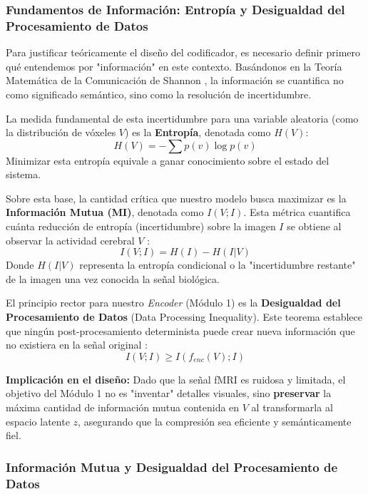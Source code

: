 \documentclass{article}
\begin{document}
\subsubsection{Fundamentos de Información: Entropía y Desigualdad del Procesamiento de Datos}

Para justificar teóricamente el diseño del codificador, es necesario definir primero qué entendemos por "información" en este contexto. Basándonos en la Teoría Matemática de la Comunicación de Shannon \cite{11}, la información se cuantifica no como significado semántico, sino como la resolución de incertidumbre.

La medida fundamental de esta incertidumbre para una variable aleatoria (como la distribución de vóxeles $V$) es la \textbf{Entropía}, denotada como $H(V)$:
\begin{equation}
    H(V) = - \sum p(v) \log p(v)
\end{equation}
Minimizar esta entropía equivale a ganar conocimiento sobre el estado del sistema.

Sobre esta base, la cantidad crítica que nuestro modelo busca maximizar es la \textbf{Información Mutua (MI)}, denotada como $I(V; I)$. Esta métrica cuantifica cuánta reducción de entropía (incertidumbre) sobre la imagen $I$ se obtiene al observar la actividad cerebral $V$ \cite{12}:
\begin{equation}
    I(V; I) = H(I) - H(I|V)
\end{equation}
Donde $H(I|V)$ representa la entropía condicional o la "incertidumbre restante" de la imagen una vez conocida la señal biológica.

El principio rector para nuestro \textit{Encoder} (Módulo 1) es la \textbf{Desigualdad del Procesamiento de Datos} (Data Processing Inequality). Este teorema establece que ningún post-procesamiento determinista puede crear nueva información que no existiera en la señal original \cite{12}:
\begin{equation}
    I(V; I) \geq I(f_{enc}(V); I)
\end{equation}

\textbf{Implicación en el diseño:} Dado que la señal fMRI es ruidosa y limitada, el objetivo del Módulo 1 no es "inventar" detalles visuales, sino \textbf{preservar} la máxima cantidad de información mutua contenida en $V$ al transformarla al espacio latente $z$, asegurando que la compresión sea eficiente y semánticamente fiel.

\subsubsection{Información Mutua y Desigualdad del Procesamiento de Datos}
\end{document}
